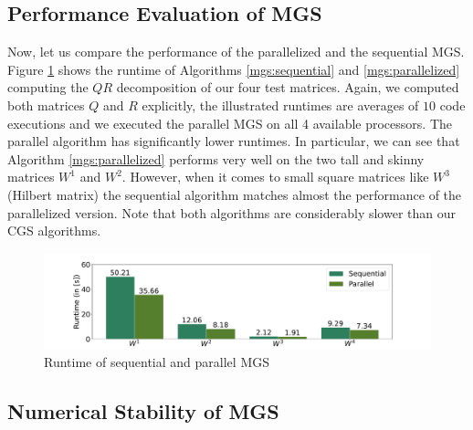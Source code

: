 \documentclass{article}
\begin{document}
\subsection{Performance Evaluation of MGS}

Now, let us compare the performance of the parallelized and the sequential MGS.
Figure \ref{fig:performanceMGS} shows the runtime of Algorithms
\ref{mgs:sequential} and \ref{mgs:parallelized} computing the $QR$ decomposition
of our four test matrices. Again, we computed both matrices $Q$ and $R$
explicitly, the illustrated runtimes are averages of $10$ code executions and we
executed the parallel MGS on all 4 available processors. The parallel algorithm
has significantly lower runtimes. In particular, we can see that Algorithm
\ref{mgs:parallelized} performs very well on the two tall and skinny matrices
$W^1$ and $W^2$. However, when it comes to small square matrices like $W^3$
(Hilbert matrix) the sequential algorithm matches almost the performance of the
parallelized version. Note that both algorithms are considerably slower than our
CGS algorithms.
\begin{figure}[t]
    \centering
    \caption{Runtime of sequential and parallel MGS} \label{fig:performanceMGS}
    \includegraphics[width=\textwidth, trim = 0cm 1.5cm 0cm 1.25cm]{./plots/MGS_Performance.pdf}
\end{figure}

\subsection{Numerical Stability of MGS}
\end{document}
